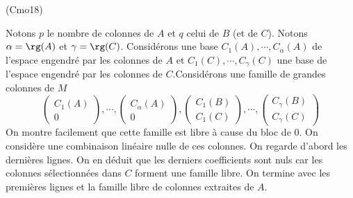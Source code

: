 \begin{tiny}(Cmo18)\end{tiny} Notons $p$ le nombre de colonnes de $A$ et $q$ celui de $B$ (et de $C$). Notons  $\alpha = \rg(A)$ et $\gamma = \rg(C)$.\newline
Considérons une base $C_1(A), \cdots, C_\alpha(A)$ de l'espace engendré par les colonnes de $A$ et $C_1(C), \cdots, C_\gamma(C)$ une base de l'espace engendré par les colonnes de $C$.\newline Considérons une famille de \og grandes\fg~ colonnes de $M$
\[
  \begin{pmatrix} 
    C_1(A) \\ 0
  \end{pmatrix}, \cdots,
    \begin{pmatrix} 
    C_{\alpha}(A) \\ 0
  \end{pmatrix},
  \begin{pmatrix} 
    C_1(B) \\ C_1(C)
  \end{pmatrix}, \cdots,
    \begin{pmatrix} 
    C_{\gamma}(B) \\ C_{\gamma}(C)
  \end{pmatrix}
\]
On montre facilement que cette famille est libre à cause du bloc de $0$. On considère une combinaison linéaire nulle de ces colonnes.
On regarde d'abord les dernières lignes. On en déduit que les derniers coefficients sont nuls  car les colonnes sélectionnées dans $C$ forment une famille libre.
On termine avec les premières lignes et la famille libre de colonnes extraites de $A$. 
